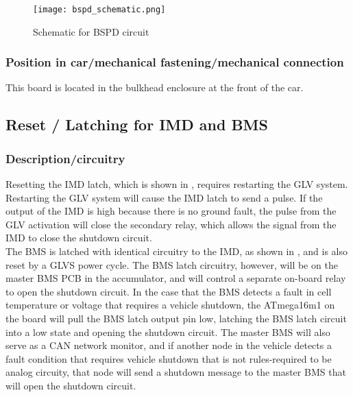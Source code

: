\documentclass{article}
\begin{document}
  \begin{figure}[H]
        \centering
        \texttt{[image: bspd\_schematic.png]}
        \caption{Schematic for BSPD circuit}
        \label{fig:bspd_schematic}
  \end{figure}

\subsubsection{Position in car/mechanical fastening/mechanical connection}

This board is located in the bulkhead enclosure at the front of the car.

\subsection{Reset / Latching for IMD and BMS}\label{reset_latching_for_imd_and_bms}
\subsubsection{Description/circuitry}

Resetting the IMD latch, which is shown in  , requires restarting the GLV system. Restarting the GLV system will cause the IMD latch to send a pulse. If the output of the IMD is high because there is no ground fault, the pulse from the GLV activation will close the secondary relay, which allows the signal from the IMD to close the shutdown circuit.\\

The BMS is latched with identical circuitry to the IMD, as shown in , and is also reset by a GLVS power cycle. The BMS latch circuitry, however, will be on the master BMS PCB in the accumulator, and will control a separate on-board relay to open the shutdown circuit. In the case that the BMS detects a fault in cell temperature or voltage that requires a vehicle shutdown, the ATmega16m1 on the board will pull the BMS latch output pin low, latching the BMS latch circuit into a low state and opening the shutdown circuit. The master BMS will also serve as a CAN network monitor, and if another node in the vehicle detects a fault condition that requires vehicle shutdown that is not rules-required to be analog circuity, that node will send a shutdown message to the master BMS that will open the shutdown circuit. 
\end{document}
